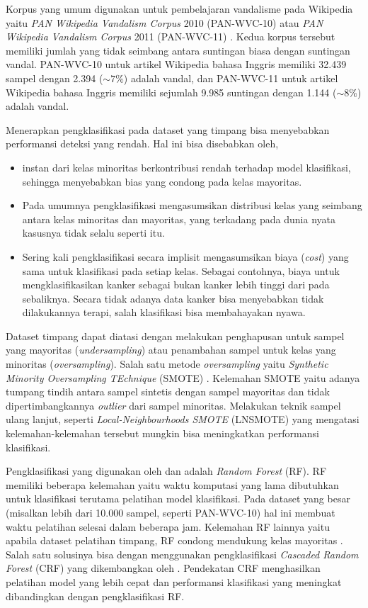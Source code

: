 Korpus yang umum digunakan untuk pembelajaran vandalisme pada Wikipedia yaitu
\textit{PAN Wikipedia Vandalism Corpus} 2010 (PAN-WVC-10)
atau
\textit{PAN Wikipedia Vandalism Corpus} 2011 (PAN-WVC-11)
\parencite{potthast:2010b}.
Kedua korpus tersebut memiliki jumlah yang tidak seimbang antara suntingan
biasa dengan suntingan vandal.
PAN-WVC-10 untuk artikel Wikipedia bahasa Inggris memiliki 32.439 sampel dengan
2.394 ($\sim 7\%$) adalah vandal, dan PAN-WVC-11 untuk
artikel Wikipedia bahasa Inggris memiliki sejumlah 9.985 suntingan dengan 1.144
($\sim 8\%$) adalah vandal.

Menerapkan pengklasifikasi pada dataset yang timpang bisa menyebabkan
performansi deteksi yang rendah.
Hal ini bisa disebabkan oleh,
\begin{itemize}
	\item instan dari kelas minoritas berkontribusi rendah
	terhadap model klasifikasi, sehingga menyebabkan bias yang condong pada
	kelas mayoritas.
	\item Pada umumnya pengklasifikasi mengasumsikan distribusi kelas yang
	seimbang antara kelas minoritas dan mayoritas, yang terkadang pada
	dunia nyata kasusnya tidak selalu seperti itu.
	\item Sering kali pengklasifikasi secara implisit mengasumsikan biaya
	(\textit{cost}) yang sama untuk klasifikasi pada setiap kelas.
	Sebagai contohnya, biaya untuk mengklasifikasikan kanker sebagai bukan
	kanker lebih tinggi dari pada sebaliknya.
	Secara tidak adanya data kanker bisa menyebabkan tidak dilakukannya
	terapi, salah klasifikasi bisa membahayakan nyawa.
\end{itemize}

\vspace{1.5em}
Dataset timpang dapat diatasi dengan melakukan penghapusan untuk sampel yang
mayoritas (\textit{undersampling}) atau penambahan sampel untuk kelas
yang minoritas (\textit{oversampling}).
Salah satu metode \textit{oversampling} yaitu \textit{Synthetic Minority
Oversampling TEchnique} (SMOTE) \parencite{chawla2002smote}.
Kelemahan SMOTE yaitu adanya tumpang tindih antara sampel sintetis dengan
sampel mayoritas dan tidak dipertimbangkannya \textit{outlier} dari sampel
minoritas.
Melakukan teknik sampel ulang lanjut, seperti
\textit{Local-Neighbourhoods SMOTE} (LNSMOTE)
\parencite{maciejewski2011local} yang mengatasi kelemahan-kelemahan tersebut
mungkin bisa meningkatkan performansi klasifikasi.

Pengklasifikasi yang digunakan oleh \textcite{mola2012wikipedia} dan
\textcite{gotze2014advanced} adalah \textit{Random Forest} (RF).
RF memiliki beberapa kelemahan yaitu waktu komputasi yang lama
dibutuhkan untuk klasifikasi terutama pelatihan model klasifikasi.
Pada dataset yang besar (misalkan lebih dari 10.000 sampel, seperti
PAN-WVC-10) hal ini membuat waktu pelatihan selesai dalam beberapa jam.
Kelemahan RF lainnya yaitu apabila dataset pelatihan timpang, RF condong
mendukung kelas mayoritas \parencite{strobl2007bias}.
Salah satu solusinya bisa dengan menggunakan pengklasifikasi \textit{Cascaded
Random Forest} (CRF) yang dikembangkan oleh \textcite{baumann2013cascaded}.
Pendekatan CRF menghasilkan pelatihan model yang lebih cepat dan performansi
klasifikasi yang meningkat dibandingkan dengan pengklasifikasi RF.
